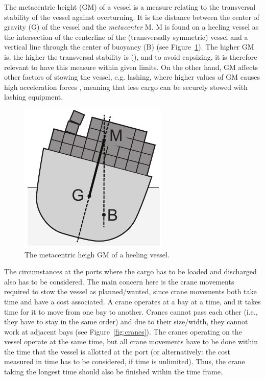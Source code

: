 The metacentric height (GM) of a vessel is a measure relating to the transversal stability of the vessel against overturning. It is the distance between the center of gravity (G) of the vessel and the \emph{metacenter} M. M is found on a heeling vessel as the intersection of the centerline of the (transversally symmetric) vessel and a vertical line through the center of buoyancy (B) (see Figure~\ref{fig:GMA}). The higher GM is, the higher the transversal stability is (\cite{JPAV18}), and to avoid capsizing, it is therefore relevant to have this measure within given limits. 
On the other hand, GM affects other factors of stowing the vessel, e.g. lashing, where {higher} values of GM causes high acceleration forces , meaning that less cargo can be securely stowed with lashing equipment. 

\begin{figure}
	\centering
		\includegraphics[scale=0.7]{figures/GM.pdf}
	\caption{The metacentric heigh GM of a heeling vessel.}
	\label{fig:GMA}
\end{figure}

The circumstances at the ports where the cargo has to be loaded and discharged also has to be considered. 
The main concern here is the crane movements required to stow the vessel as planned/wanted, since crane movements both take time and have a cost associated. 
A crane operates at a bay at a time, and it takes time for it to move from one bay to another. Cranes cannot pass each other (i.e., they have to stay in the same order) and due to their size/width, they cannot work at adjacent bays (see Figure~\ref{fig:cranes}). The cranes operating on the vessel operate at the same time, but all crane movements have to be done within the time that the vessel is allotted at the port (or alternatively: the cost measured in time has to be considered, if time is unlimited). Thus, the crane taking the longest time should also be finished within the time frame.

